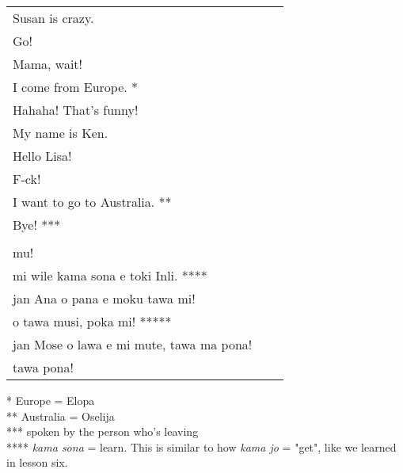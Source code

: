 \begin{supertabular}{p{5,5cm}|ll}
Susan is crazy. &&   \\ %
Go!  &&  \\ %
Mama, wait!  &&  \\ %
I come from Europe. * &&  \\ %
Hahaha! That's funny!  &&  \\ %
My name is Ken. &&  \\  %
Hello Lisa!  && \\  %
F-ck!  &&   \\ %
I want to go to Australia. **  &&  \\  %
Bye! *** &&   \\ %
 && \\ %
mu! &&   \\ %
mi wile kama sona e toki Inli. **** &&  \\ %
jan Ana o pana e moku tawa mi!  &&  \\ %
o tawa musi, poka mi! ***** &&  \\ %
jan Mose o lawa e mi mute, tawa ma pona! &&   \\ %
tawa pona!  &&   \\ %
\end{supertabular} 

* Europe = Elopa \\
** Australia = Oselija \\
*** spoken by the person who's leaving \\
****  \textit{kama sona} = learn. This is similar to how \textit{kama jo} = "get", like we learned in lesson six. \\
